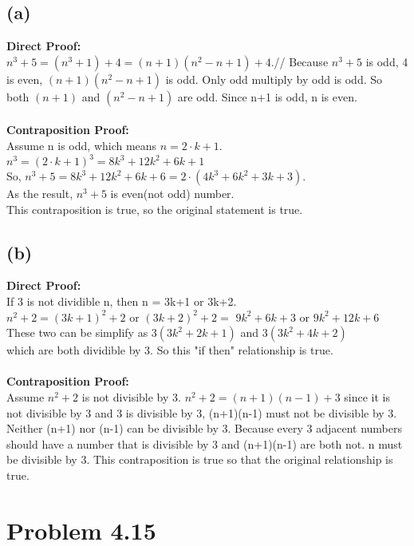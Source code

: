 \documentclass{article}
\begin{document}
\subsection*{(a)}
\textbf{Direct Proof:}\\ 
$n^3+5 = (n^3+1)+4 = (n+1)(n^2-n+1)+4$.//
Because $n^3+5$ is odd, 4 is even, $(n+1)(n^2-n+1)$ is odd. Only odd multiply by odd is odd. So both $(n+1)$ and $(n^2-n+1)$ are odd. Since n+1 is odd, n is even.\\\\
\textbf{Contraposition Proof:}\\ 
Assume n is odd, which means $n=2\cdot k+1$.\\
$n^3 = (2\cdot k+1)^3 = 8k^3+12k^2+6k+1$\\
So, $n^3+5 = 8k^3+12k^2+6k+6 = 2\cdot (4k^3+6k^2+3k+3)$.\\
As the result, $n^3+5$ is even(not odd) number.\\
 This contraposition is true, so the original statement is true.

\subsection*{(b)}
\textbf{Direct Proof:}\\
If 3 is not dividible n, then n = 3k+1 or 3k+2.\\
$n^2+2 = (3k+1)^2+2$ or $(3k+2)^2+2 = $ $9k^2+6k+3$ or $9k^2+12k+6$\\
These two can be simplify as $3(3k^2+2k+1)$ and $3(3k^2+4k+2)$\\
which are both dividible by 3. So this "if then" relationship is true.\\\\
\textbf{Contraposition Proof:}\\ 
Assume $n^2+2$ is not divisible by 3. $n^2+2 = (n+1)(n-1)+3$ since it is not divisible by 3 and 3 is divisible by 3, (n+1)(n-1) must not be divisible by 3. Neither (n+1) nor (n-1) can be divisible by 3. Because every 3 adjacent numbers should have a number that is divisible by 3 and (n+1)(n-1) are both not. n must be divisible by 3. This contraposition is true so that the original relationship is true.\\

\newpage
\section*{Problem 4.15}
\end{document}
